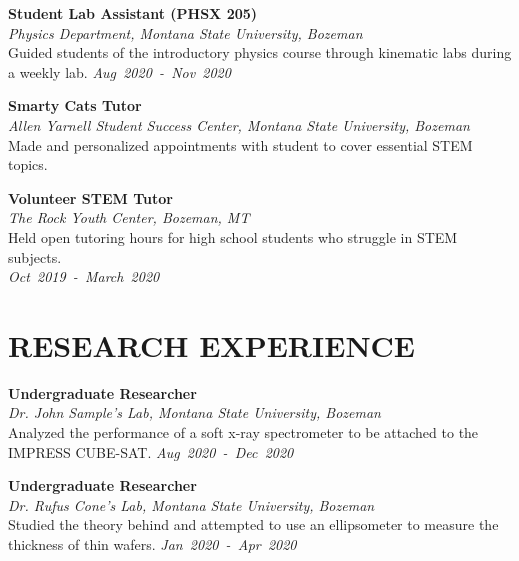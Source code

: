 \documentclass[margin]{res}
\begin{document}
\begin{resume}
\noindent
\raggedright
\textbf{Student Lab Assistant (PHSX 205)}\\
{\sl Physics Department, Montana State University, Bozeman}\\\vspace{0.5ex}
Guided students of the introductory physics course through kinematic labs during a weekly lab. \hfill
{\sl Aug~2020~-~Nov~2020}

\noindent
\raggedright
\textbf{Smarty Cats Tutor}\\\vspace{0.5ex}
{\sl Allen Yarnell Student Success Center, Montana State University, Bozeman}\\
Made and personalized appointments with student to cover essential STEM topics.\\

\noindent
\raggedright
\textbf{Volunteer STEM Tutor}\\
{\sl The Rock Youth Center, Bozeman, MT}\\\vspace{0.5ex}
Held open tutoring hours for high school students who struggle in STEM subjects.\\
\raggedleft
{\sl Oct~2019~-~March~2020}


\section{RESEARCH EXPERIENCE}
\noindent
\raggedright
\textbf{Undergraduate Researcher}\\
{\sl Dr. John Sample's Lab, Montana State University, Bozeman}\\\vspace{0.5ex}
Analyzed the performance of a soft x-ray spectrometer to be attached to the IMPRESS CUBE-SAT.  \hfill
{\sl Aug~2020~-~Dec~2020}

\noindent
\raggedright
\textbf{Undergraduate Researcher}\\
{\sl Dr. Rufus Cone's Lab, Montana State University, Bozeman}\\\vspace{0.5ex}
Studied the theory behind and attempted to use an ellipsometer to measure the thickness of thin wafers.  \hfill
{\sl Jan~2020~-~Apr~2020}



\end{resume}
\end{document}
